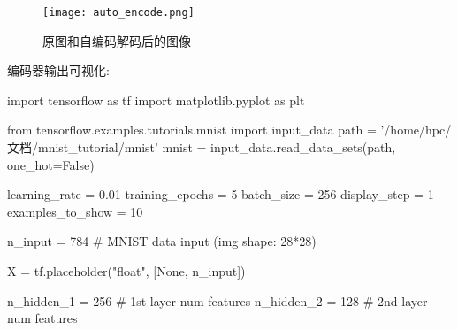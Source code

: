 \begin{center}
\begin{figure}[H]
\texttt{[image: auto\_encode.png]}
\caption{原图和自编码解码后的图像}
\end{figure}
\end{center}
编码器输出可视化:
\begin{python}
import tensorflow as tf
import matplotlib.pyplot as plt

from tensorflow.examples.tutorials.mnist import input_data
path = '/home/hpc/文档/mnist_tutorial/mnist'
mnist = input_data.read_data_sets(path, one_hot=False)

learning_rate = 0.01
training_epochs = 5
batch_size = 256
display_step = 1
examples_to_show = 10

n_input = 784  # MNIST data input (img shape: 28*28)

X = tf.placeholder("float", [None, n_input])

n_hidden_1 = 256 # 1st layer num features
n_hidden_2 = 128 # 2nd layer num features


\end{python}
